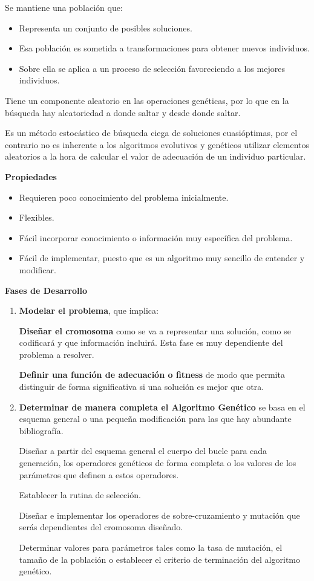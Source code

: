 \documentclass[12pt, twoside, openright]{report} %
\begin{document}
Se mantiene una población que:
\begin{itemize}
	\item Representa un conjunto de posibles soluciones.
	\item Esa población es sometida a transformaciones para obtener nuevos individuos.
	\item Sobre ella se aplica a un proceso de selección favoreciendo a los mejores individuos.
\end{itemize}

Tiene un componente aleatorio en las operaciones genéticas, por lo que en la búsqueda hay aleatoriedad a donde saltar y desde donde saltar.

Es un método estocástico de búsqueda ciega de soluciones cuasióptimas, por el contrario no es inherente a los algoritmos evolutivos y genéticos  utilizar elementos aleatorios a la hora de calcular el valor de adecuación de un individuo particular.

\textbf{Propiedades}
\begin{itemize}
	\item Requieren poco conocimiento del problema inicialmente.
	\item Flexibles.
	\item Fácil incorporar conocimiento o información muy específica del problema.
	\item Fácil de implementar, puesto que es un algoritmo muy sencillo de entender y modificar.
\end{itemize}

\textbf{Fases de Desarrollo}
\begin{enumerate}
	\item \textbf{Modelar el problema}, que implica:

	      \textbf{Diseñar el cromosoma} como se va a representar una solución, como se codificará y que información incluirá. Esta fase es muy dependiente del problema a resolver.

	      \textbf{Definir una función de adecuación o fitness} de modo que permita distinguir de forma significativa si una solución es mejor que otra.
	\item \textbf{Determinar de manera completa el Algoritmo Genético} se basa en el esquema general o una pequeña modificación para las que hay abundante bibliografía.

	      Diseñar a partir del esquema general el cuerpo del bucle para cada generación, los operadores genéticos de forma completa o los valores de los parámetros que definen a estos operadores.

	      Establecer la rutina de selección.

	      Diseñar e implementar los operadores de sobre-cruzamiento y mutación que serás dependientes del cromosoma diseñado.

	      Determinar valores para parámetros tales como la tasa de mutación, el tamaño de la población o establecer el criterio de terminación del algoritmo genético.
\end{enumerate}
\end{document}
